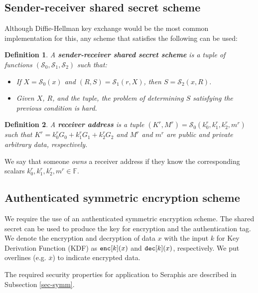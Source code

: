 \documentclass{article}
\theoremstyle{plain}
\newtheorem{definition}{Definition}[section]
\theoremstyle{remark}
\begin{document}
\subsection{Sender-receiver shared secret scheme}
Although Diffie-Hellman key exchange would be the most common implementation for this, any scheme that satisfies the following can be used:
\begin{definition}\label{sha-sec}
A \textbf{\em sender-receiver shared secret scheme} is a tuple of functions $(\mathcal{S}_0, \mathcal{S}_1, \mathcal{S}_2)$ such that:
    \begin{itemize}
        \item If $X = \mathcal{S}_0(x)$ and $(R, S) = \mathcal{S}_1(r, X)$, then $S = \mathcal{S}_2(x, R)$.
        \item Given $X$, $R$, and the tuple, the problem of determining $S$ satisfying the previous condition is hard.
    \end{itemize}
\end{definition}

\begin{definition}\label{recv-addr}
A \textbf{\em receiver address} is a tuple $(K^r, M^r) = \mathcal{S}_0(k_0^r, k_1^r, k_2^r, m^r)$  such that $K^r = k_0^r G_0 + k_1^r G_1 + k_2^r G_2$ and $M^r$ and $m^r$ are public and private arbitrary data, respectively.
\end{definition}
We say that someone \textit{owns} a receiver address if they know the corresponding scalars $k_0^r, k_1^r, k_2^r, m^r \in\mathbb{F}$.

\subsection{Authenticated symmetric encryption scheme}
We require the use of an authenticated symmetric encryption scheme. The shared secret can be used to produce the key for encryption and the authentication tag. We denote the encryption and decryption of data $x$ with the input $k$ for Key Derivation Function (KDF) as ${\tt enc}[k](x)$ and ${\tt dec}[k](x)$, respectively. We put overlines (e.g. $\overline{x}$) to indicate encrypted data.

The required security properties for application to Seraphis are described in Subsection \ref{sec-symm}.
\end{document}
